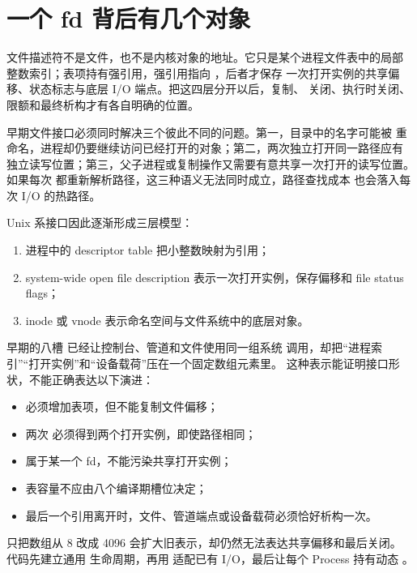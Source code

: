 \section{一个 fd 背后有几个对象}

文件描述符不是文件，也不是内核对象的地址。它只是某个进程文件表中的局部
整数索引；表项持有强引用，强引用指向 ，后者才保存
一次打开实例的共享偏移、状态标志与底层 I/O 端点。把这四层分开以后，复制、
关闭、执行时关闭、限额和最终析构才有各自明确的位置。

早期文件接口必须同时解决三个彼此不同的问题。第一，目录中的名字可能被
重命名，进程却仍要继续访问已经打开的对象；第二，两次独立打开同一路径应有
独立读写位置；第三，父子进程或复制操作又需要有意共享一次打开的读写位置。
如果每次  都重新解析路径，这三种语义无法同时成立，路径查找成本
也会落入每次 I/O 的热路径。

Unix 系接口因此逐渐形成三层模型：

\begin{enumerate}
  \item 进程中的 descriptor table 把小整数映射为引用；
  \item system-wide open file description 表示一次打开实例，保存偏移和
        file status flags；
  \item inode 或 vnode 表示命名空间与文件系统中的底层对象。
\end{enumerate}

早期的八槽  已经让控制台、管道和文件使用同一组系统
调用，却把“进程索引”“打开实例”和“设备载荷”压在一个固定数组元素里。
这种表示能证明接口形状，不能正确表达以下演进：

\begin{itemize}
  \item {} 必须增加表项，但不能复制文件偏移；
  \item 两次  必须得到两个打开实例，即使路径相同；
  \item {} 属于某一个 fd，不能污染共享打开实例；
  \item 表容量不应由八个编译期槽位决定；
  \item 最后一个引用离开时，文件、管道端点或设备载荷必须恰好析构一次。
\end{itemize}

只把数组从 8 改成 4096 会扩大旧表示，却仍然无法表达共享偏移和最后关闭。
代码先建立通用  生命周期，再用
 适配已有 I/O，最后让每个 Process 持有动态
。

